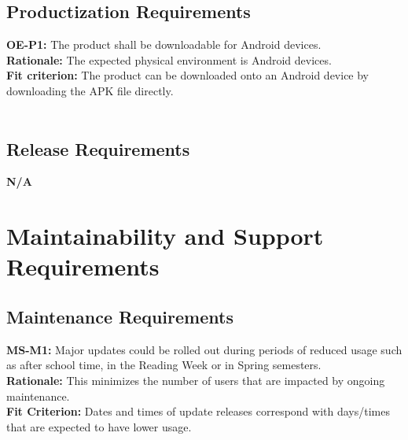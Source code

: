 \documentclass[12pt]{article}
\begin{document}
\subsection{Productization Requirements}
  \textbf{OE-P1:} The product shall be downloadable for Android devices.\\
  \textbf{Rationale:} The expected physical environment is Android devices.\\
  \textbf{Fit criterion:} The product can be downloaded onto an Android device by downloading the APK file directly.\\\\

\subsection{Release Requirements}
  \textbf{N/A}\\

\section{Maintainability and Support Requirements}
\subsection{Maintenance Requirements}
  \textbf{MS-M1:} Major updates could be rolled out during periods of reduced usage such as after school time, in the Reading Week or in Spring semesters.\\
  \textbf{Rationale:} This minimizes the number of users that are impacted by ongoing maintenance.\\
  \textbf{Fit Criterion:} Dates and times of update releases correspond with days/times that are expected to have lower usage.\\\\
\end{document}
